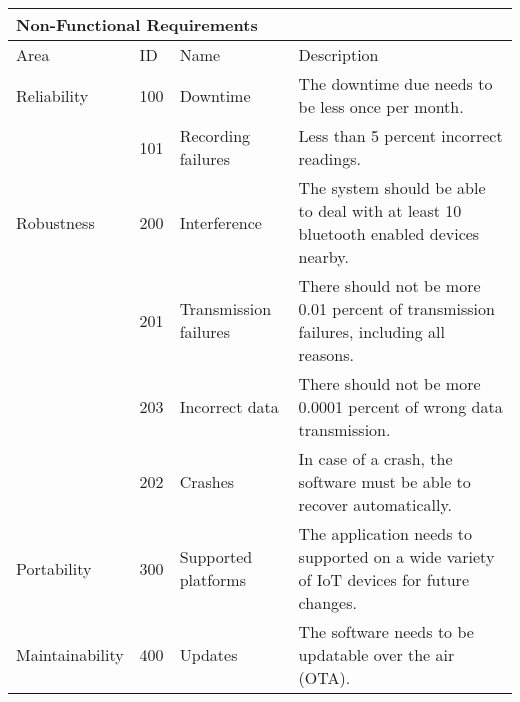     \begin{table}[]
        \begin{tabular}{ l l p{2.5cm} p{7.1cm}}
        \multicolumn{4}{l}{Non-Functional Requirements}                                                                                                                                                    \\ \hline
        Area            & ID  & Name                  & Description                                                                                                                                        \\ \hline
        Reliability     & 100 & Downtime              & The downtime due needs to be less once per month.                                                                                                  \\
                        & 101 & Recording failures    & Less than 5 percent incorrect readings.                                                                                                            \\
        Robustness      & 200 & Interference          & The system should be able to deal with at least 10 bluetooth enabled devices  nearby.                                                              \\
                        & 201 & Transmission failures & There should not be more 0.01 percent of transmission failures, including all reasons.                                                             \\
                        & 203 & Incorrect data        & There should not be more 0.0001 percent of wrong data transmission.                                                                                \\
                        & 202 & Crashes               & In case of a crash, the software must be able to recover automatically.                                                                            \\
        Portability     & 300 & Supported platforms   & The application needs to supported on a wide variety of IoT devices for future changes.                                                            \\
        Maintainability & 400 & Updates               & The software needs to be updatable over the air (OTA).                                                                                             \\

\end{tabular}
\end{table}
